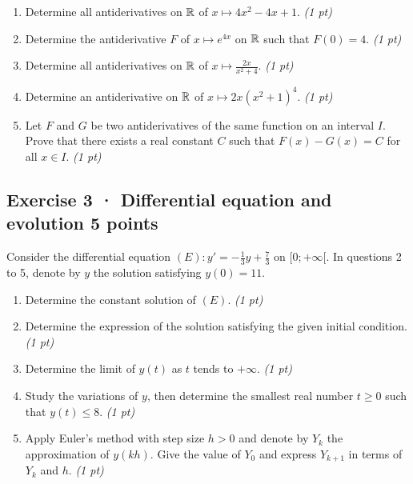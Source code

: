 \begin{enumerate}

\item Determine all antiderivatives on $\mathbb R$ of $x\mapsto 4x^2-4x+1$. \hfill\textit{(1 pt)}

\item Determine the antiderivative $F$ of $x\mapsto e^{4x}$ on $\mathbb R$ such that $F(0)=4$. \hfill\textit{(1 pt)}

\item Determine all antiderivatives on $\mathbb R$ of $x\mapsto\frac{2x}{x^2+4}$. \hfill\textit{(1 pt)}

\item Determine an antiderivative on $\mathbb R$ of $x\mapsto2x(x^2+1)^{4}$. \hfill\textit{(1 pt)}

\item Let $F$ and $G$ be two antiderivatives of the same function on an interval $I$. Prove that there exists a real constant $C$ such that $F(x)-G(x)=C$ for all $x\in I$. \hfill\textit{(1 pt)}

\end{enumerate}

\clearpage{}\par

\subsection*{Exercise 3 · Differential equation and evolution \hfill 5 points}Consider the differential equation $(E):y'=-\frac1{3}y+\frac{7}{3}$ on $[0;+\infty[$. In questions 2 to 5, denote by $y$ the solution satisfying $y(0)=11$.

\begin{enumerate}

\item Determine the constant solution of $(E)$. \hfill\textit{(1 pt)}

\item Determine the expression of the solution satisfying the given initial condition. \hfill\textit{(1 pt)}

\item Determine the limit of $y(t)$ as $t$ tends to $+\infty$. \hfill\textit{(1 pt)}

\item Study the variations of $y$, then determine the smallest real number $t\ge0$ such that $y(t)\le8$. \hfill\textit{(1 pt)}

\item Apply Euler's method with step size $h>0$ and denote by $Y_k$ the approximation of $y(kh)$. Give the value of $Y_0$ and express $Y_{k+1}$ in terms of $Y_k$ and $h$. \hfill\textit{(1 pt)}

\end{enumerate}

